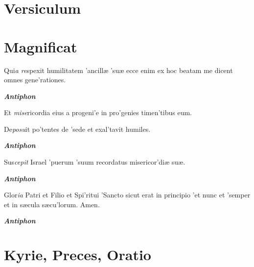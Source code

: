 \documentclass[initial=ZallmanCaps,staff=19,font=greciliae,11pt,a4paper,openany,twoside,choralsign=PfefferMediaeval]{gregorian}
\begin{document}
\section*{Versiculum}
\par
\section*{Magnificat}
\par\vskip9bp
\begin{multicols}{2}\setlength{\columnseprule}{0.2px}
Qui\textit{a re}spexit humilitatem 'ancillæ 'suæ \grestar{} ecce enim ex hoc beatam me dicent omnes gene'rationes.\par
{}\par
\textit{\textbf{Antiphon}}\par
Et \textit{mise}ricordia eius a progeni'e in pro'genies \grestar{} timen'tibus eum.\par
{}\par
De\textit{posu}it po'tentes de 'sede \grestar{} et exal'tavit humiles.\par
\textit{\textbf{Antiphon}}\par
{}\par
Sus\textit{cepit} Israel 'puerum 'suum \grestar{} recordatus misericor'diæ suæ.\par
{}\par
\textit{\textbf{Antiphon}}\par
Glor\textit{ia} Patri et Filio et Spi'ritui 'Sancto \grestar{} sicut erat in principio 'et nunc et 'semper \grestar{} et in sæcula sæcu'lorum. Amen.\par
\textit{\textbf{Antiphon}}\par
\end{multicols}
\vskip3bp
\section*{Kyrie, Preces, Oratio}
\par
{}\par
{}\par
{}\par
\end{document}
